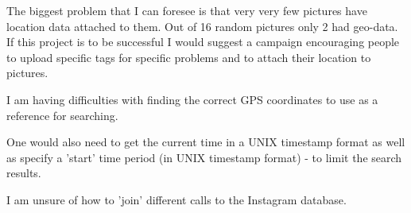 \documentclass{article}
\begin{document}
The biggest problem that I can foresee is that very very few pictures have location data attached to them. Out of 16 random pictures only 2 had geo-data. If this project is to be successful I would suggest a campaign encouraging people to upload specific tags for specific problems and to attach their location to pictures.

I am having difficulties with finding the correct GPS coordinates to use as a reference for searching.

One would also need to get the current time in a UNIX timestamp format as well as specify a 'start' time period (in UNIX timestamp format) - to limit the search results.

I am unsure of how to 'join' different calls to the Instagram database.
\end{document}

